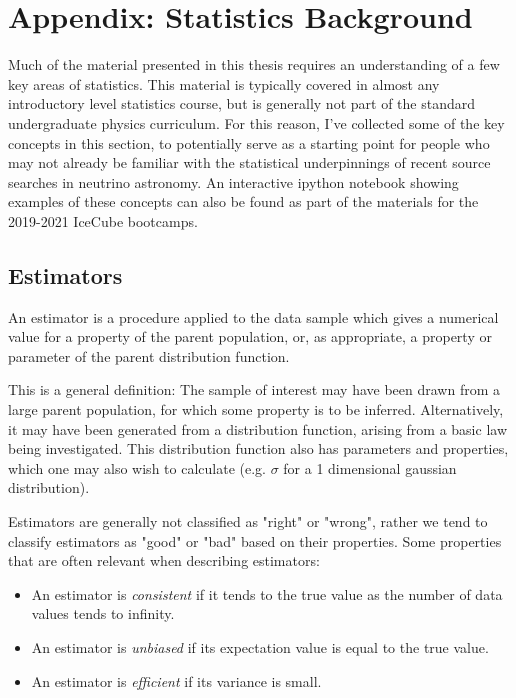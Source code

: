 \chapter{Appendix: Statistics Background}\label{chapter:stats}

Much of the material presented in this thesis requires an understanding of a few key areas of statistics. This material is typically covered in almost any introductory level statistics course, but is generally not part of the standard undergraduate physics curriculum. For this reason, I've collected some of the key concepts in this section, to potentially serve as a starting point for people who may not already be familiar with the statistical underpinnings of recent source searches in neutrino astronomy. An interactive ipython notebook showing examples of these concepts can also be found as part of the materials for the 2019-2021 IceCube bootcamps\footnotemark.


\section{Estimators}
An estimator is a procedure applied to the data sample which gives a numerical value for a property of the parent population, or, as appropriate, a property or parameter of the parent distribution function.

This is a general definition: The sample of interest may have been drawn from a large parent population, for which some property is to be inferred. Alternatively, it may have been generated from a distribution function, arising from a basic law being investigated. This distribution function also has parameters and properties, which one may also wish to calculate (e.g. $\sigma$ for a 1 dimensional gaussian distribution).

Estimators are generally not classified as "right" or "wrong", rather we tend to classify estimators as "good" or "bad" based on their properties. Some properties that are often relevant when describing estimators:

\begin{itemize}
    \item An estimator is \textit{consistent} if it tends to the true value as the number of data values tends to infinity.
    \item An estimator is \textit{unbiased} if its expectation value is equal to the true value.
    \item An estimator is \textit{efficient} if its variance is small.
\end{itemize}


